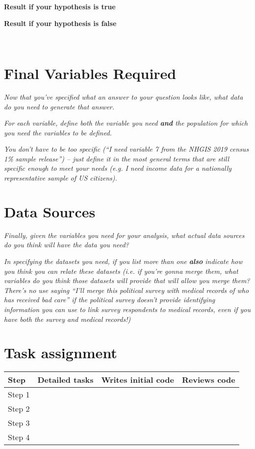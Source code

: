 \documentclass[12pt]{article}
\begin{document}
\begin{minipage}{0.5\textwidth}
\centering
\textbf{Result if your hypothesis is true}
\end{minipage}
\begin{minipage}{0.5\textwidth}
\centering
\textbf{Result if your hypothesis is false}
\end{minipage}
\vspace*{5cm}\\
\section{Final Variables Required}

\emph{Now that you've specified what an answer to your question looks like, what data do you need to generate that answer.}

\emph{For each variable, define both the variable you need \textbf{and} the population for which you need the variables to be defined.}

\emph{You don't have to be too specific (``I need variable 7 from the NHGIS 2019 census 1\% sample release'') -- just define it in the most general terms that are still specific enough to meet your needs (e.g. I need income data for a nationally representative sample of US citizens). }
\pagebreak
\section{Data Sources}

\emph{Finally, given the variables you need for your analysis, what actual data sources do you think will have the data you need?}

\emph{In specifying the datasets you need, if you list more than one \textbf{also} indicate how you think you can relate these datasets (i.e. if you're gonna merge them, what variables do you think those datasets will provide that will allow you merge them? There's no use saying ``I'll merge this political survey with medical records of who has received bad care'' if the political survey doesn't provide identifying information you can use to link survey respondents to medical records, even if you have both the survey and medical records!)}
\vspace*{2cm}\\


\section{Task assignment}

\begin{center}
\begin{tabular}{ l l l l}
 Step & Detailed tasks & Writes initial code & Reviews code\\ \hline
 Step 1 & & & \\  
 Step 2 & & & \\
 Step 3 & & & \\
 Step 4 & & & \\
\end{tabular}
\end{center}
\end{document}
